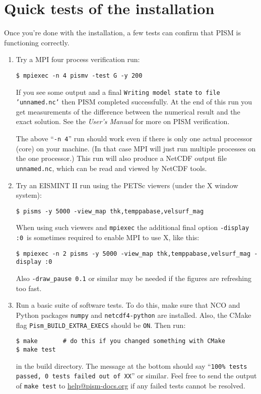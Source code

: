 \documentclass[titlepage,letterpaper,final]{scrartcl}
\begin{document}
\section{Quick tests of the installation} \label{sec:tests}
Once you're done with the installation, a few tests can confirm that PISM is functioning correctly.
\begin{enumerate}
\item Try a MPI four process verification run:

\begin{verbatim}
$ mpiexec -n 4 pismv -test G -y 200
\end{verbatim}

  \noindent If you see some output and a final \texttt{Writing model state}
  \texttt{to file 'unnamed.nc'} then PISM completed
  successfully. At the end of this run you get measurements of the difference
  between the numerical result and the exact solution. See the \emph{User's
    Manual} for more on PISM verification.

  The above ``\texttt{-n 4}'' run should work even if there is only one actual
  processor (core) on your machine.  (In that case MPI will just run multiple
  processes on the one processor.)  This run will also produce a NetCDF output
  file \texttt{unnamed.nc}, which can be read and viewed by NetCDF tools.

\item Try an EISMINT II run using the PETSc viewers (under the X window system):

\begin{verbatim}
$ pisms -y 5000 -view_map thk,temppabase,velsurf_mag
\end{verbatim}

  \noindent When using such viewers and \texttt{mpiexec} the additional final
  option \texttt{-display :0} \,is sometimes required to enable MPI to use X,
  like this:

\begin{verbatim}
$ mpiexec -n 2 pisms -y 5000 -view_map thk,temppabase,velsurf_mag -display :0
\end{verbatim}

\noindent Also \texttt{-draw_pause 0.1} or similar may be needed if the figures
are refreshing too fast.

\item Run a basic suite of software tests. To do this, make sure that
  NCO and Python packages \texttt{numpy} and \texttt{netcdf4-python}
  are installed. Also, the CMake flag \texttt{Pism_BUILD_EXTRA_EXECS}
  should be \texttt{ON}. Then run:
\begin{verbatim}
$ make       # do this if you changed something with CMake
$ make test
\end{verbatim}
  \noindent in the build directory. The message at the bottom should
  say ``\texttt{100\% tests passed, 0 tests failed out of XX}'' or
  similar. Feel free to send the output of \texttt{make test} to
  \href{mailto:help@pism-docs.org}{help@pism-docs.org} if any failed
  tests cannot be resolved.
\end{enumerate}
\end{document}
